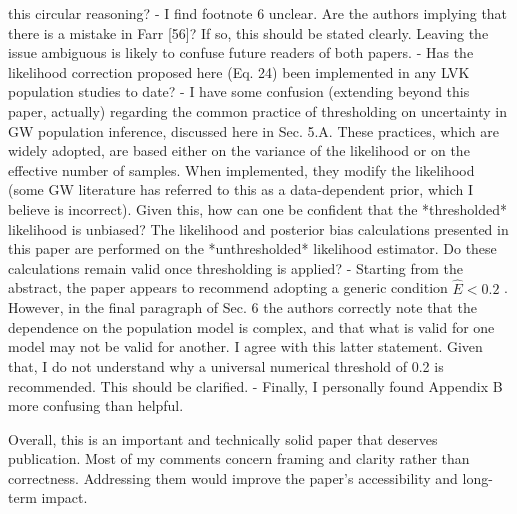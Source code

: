 this circular reasoning?
- I find footnote 6 unclear. Are the authors implying that there is a mistake in
Farr [56]? If so, this should be stated clearly. Leaving the issue ambiguous is
likely to confuse future readers of both papers.
- Has the likelihood correction proposed here (Eq. 24) been implemented in any
LVK population studies to date?
- I have some confusion (extending beyond this paper, actually) regarding the
common practice of thresholding on uncertainty in GW population inference,
discussed here in Sec. 5.A. These practices, which are widely adopted, are based
either on the variance of the likelihood or on the effective number of samples.
When implemented, they modify the likelihood (some GW literature has referred to
this as a data-dependent prior, which I believe is incorrect). Given this, how
can one be confident that the *thresholded* likelihood is unbiased? The
likelihood and posterior bias calculations presented in this paper are performed
on the *unthresholded* likelihood estimator. Do these calculations remain valid
once thresholding is applied?
- Starting from the abstract, the paper appears to recommend adopting a generic
condition  $\hat{E} < 0.2$ . However, in the final paragraph of Sec. 6 the
authors correctly note that the dependence on the population model is complex,
and that what is valid for one model may not be valid for another. I agree with
this latter statement. Given that, I do not understand why a universal numerical
threshold of 0.2 is recommended. This should be clarified.
- Finally, I personally found Appendix B more confusing than helpful.

Overall, this is an important and technically solid paper that deserves
publication. Most of my comments concern framing and clarity rather than
correctness. Addressing them would improve the paper's accessibility and
long-term impact.